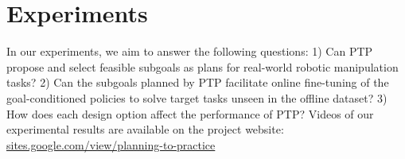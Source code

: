 \section{Experiments}

In our experiments, we aim to answer the following questions: 1) Can PTP propose and select feasible subgoals as plans for real-world robotic manipulation tasks? 2) Can the subgoals planned by PTP facilitate online fine-tuning of the goal-conditioned policies to solve target tasks unseen in the offline dataset? 3) How does each design option affect the performance of PTP?
Videos of our experimental results are available on the project website: \href{https://sites.google.com/view/planning-to-practice}{sites.google.com/view/planning-to-practice}

    
    


